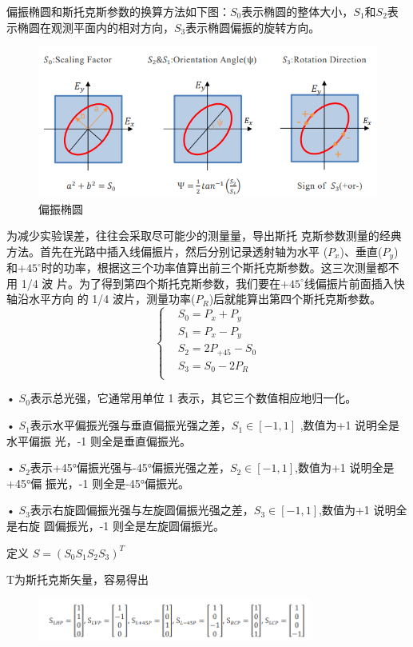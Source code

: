 \documentclass[10pt,a4paper,twoside,UTF8]{ctexart}
\begin{document}
偏振椭圆和斯托克斯参数的换算方法如下图：$S_0$表示椭圆的整体大小，$S_1$和$S_2$表
示椭圆在观测平面内的相对方向，$S_3$表示椭圆偏振的旋转方向。

\begin{figure}[H]
	\centering
	\includegraphics[width=\textwidth]{img//15.png}
	\caption{偏振椭圆}
	\label{fig:15}
\end{figure}

为减少实验误差，往往会采取尽可能少的测量量，导出斯托
克斯参数测量的经典方法。首先在光路中插入线偏振片，然后分别记录透射轴为水平
($P_x$)、垂直($P_y$)和$+45^{\circ}$时的功率，根据这三个功率值算出前三个斯托克斯参数。这三次测量都不用 1/4 波
片。为了得到第四个斯托克斯参数，我们要在$+45^{\circ}$线偏振片前面插入快轴沿水平方向
的 1/4 波片，测量功率($P_R$)后就能算出第四个斯托克斯参数。
\[\left\{
\begin{aligned}
&S_0=P_x+P_y\\
&S_1=P_x-P_y\\
&S_2=2P_{+45}-S_0\\
&S_3=S_0-2P_R\\
\end{aligned}
\right.
\]

• $S_0$表示总光强，它通常用单位 1 表示，其它三个数值相应地归一化。

• $S_1$表示水平偏振光强与垂直偏振光强之差，$S_1 \in [-1,1]$ ,数值为+1 说明全是水平偏振
光，-1 则全是垂直偏振光。

• $S_2$表示+45°偏振光强与-45°偏振光强之差，$S_2 \in [-1,1]$,数值为+1 说明全是+45°偏
振光，-1 则全是-45°偏振光。

• $S_3$表示右旋圆偏振光强与左旋圆偏振光强之差，$S_3 \in [-1,1]$,数值为+1 说明全是右旋
圆偏振光，-1 则全是左旋圆偏振光。

定义 $S = (S_0 S_1 S_2 S_3)^{T}$

T为斯托克斯矢量，容易得出

\begin{figure}[H]
	\centering
	\includegraphics[width=0.8\textwidth]{img//16.png}
\end{figure}
\end{document}
